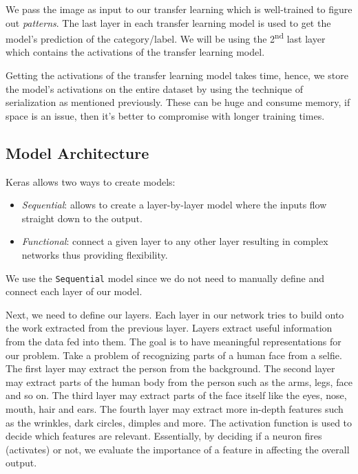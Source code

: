 \documentclass[twocolumn]{article}
\begin{document}
We pass the image as input to our transfer learning which is well-trained to 
figure out \textit{patterns}. The last layer in each transfer learning model 
is used to get the model’s prediction of the category/label. We will be using 
the 2\textsuperscript{nd} last layer which contains the activations of the 
transfer learning model.

Getting the activations of the transfer learning model takes time, hence, we 
store the model's activations on the entire dataset by using the technique of 
serialization as mentioned previously. These can be huge and consume memory, 
if space is an issue, then it’s better to compromise with longer training 
times.

\subsection{Model Architecture}

Keras allows two ways to create models:
\begin{itemize}
  \item \textit{Sequential}: allows to create a layer-by-layer model where the 
  inputs flow straight down to the output.
  \item \textit{Functional}: connect a given layer to any other layer 
  resulting in complex networks thus providing flexibility.
\end{itemize}

We use the \texttt{Sequential} model since we do not need to manually define 
and connect each layer of our model.

Next, we need to define our layers. Each layer in our network tries to build 
onto the work extracted from the previous layer. Layers extract useful 
information from the data fed into them. The goal is to have meaningful 
representations for our problem. Take a problem of recognizing parts of a 
human face from a selfie. The first layer may extract the person from the 
background. The second layer may extract parts of the human body from the 
person such as the arms, legs, face and so on. The third layer may extract 
parts of the face itself like the eyes, nose, mouth, hair and ears. The fourth 
layer may extract more in-depth features such as the wrinkles, dark circles, 
dimples and more. The activation function is used to decide which features are 
relevant. Essentially, by deciding if a neuron fires (activates) or not, we 
evaluate the importance of a feature in affecting the overall output.
\end{document}
